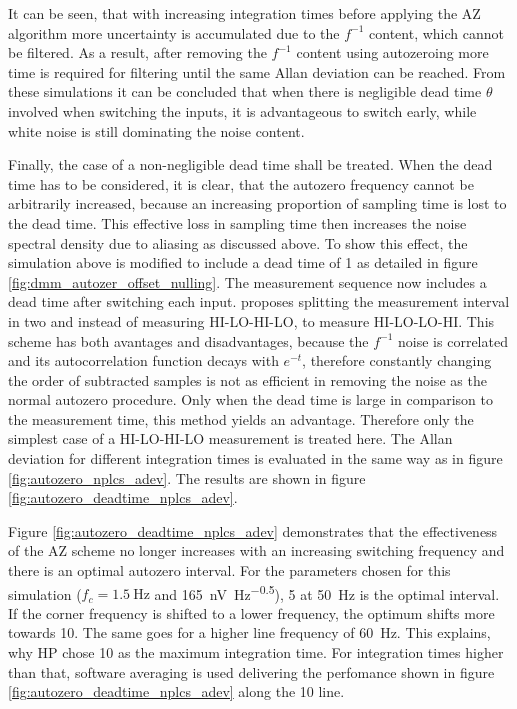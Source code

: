 It can be seen, that with increasing integration times before applying the AZ algorithm more uncertainty is accumulated due to the $f^{-1}$ content, which cannot be filtered. As a result, after removing the $f^{-1}$ content using autozeroing more time is required for filtering until the same Allan deviation can be reached. From these simulations it can be concluded that when there is negligible dead time $\theta$ involved when switching the inputs, it is advantageous to switch early, while white noise is still dominating the noise content.%

Finally, the case of a non-negligible dead time shall be treated. When the dead time has to be considered, it is clear, that the autozero frequency cannot be arbitrarily increased, because an increasing proportion of sampling time is lost to the dead time. This effective loss in sampling time then increases the noise spectral density due to aliasing as discussed above. To show this effect, the simulation above is modified to include a dead time of \qty{1}{\plc} as detailed in figure \ref{fig:dmm_autozer_offset_nulling}. The measurement sequence now includes a dead time after switching each input. \citeauthor{autozero_with_dead_time} proposes \cite{autozero_with_dead_time} splitting the measurement interval in two and instead of measuring HI-LO-HI-LO, to measure HI-LO-LO-HI. This scheme has both avantages and disadvantages, because the $f^{-1}$ noise is correlated and its autocorrelation function decays with $e^{-t}$, therefore constantly changing the order of subtracted samples is not as efficient in removing the noise as the normal autozero procedure. Only when the dead time is large in comparison to the measurement time, this method yields an advantage. Therefore only the simplest case of a HI-LO-HI-LO measurement is treated here. The Allan deviation for different integration times is evaluated in the same way as in figure \ref{fig:autozero_nplcs_adev}. The results are shown in figure \ref{fig:autozero_deadtime_nplcs_adev}.

Figure \ref{fig:autozero_deadtime_nplcs_adev} demonstrates that the effectiveness of the AZ scheme no longer increases with an increasing switching frequency and there is an optimal autozero interval. For the parameters chosen for this simulation ($f_c = \qty{1.5}{\Hz}$ and \qty[power-half-as-sqrt, per-mode=symbol]{165}{\nV \Hz\tothe{-0.5}}), \qty{5}{\plc} at \qty{50}{\Hz} is the optimal interval. If the corner frequency is shifted to a lower frequency, the optimum shifts more towards \qty{10}{\plc}. The same goes for a higher line frequency of \qty{60}{\Hz}. This explains, why HP chose \qty{10}{\plc} as the maximum integration time. For integration times higher than that, software averaging is used delivering the perfomance shown in figure \ref{fig:autozero_deadtime_nplcs_adev} along the \qty{10}{\plc} line.

